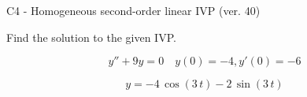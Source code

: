 \begin{exercise}
  \begin{exerciseTitle}C4 - Homogeneous second-order linear IVP (ver. 40)\end{exerciseTitle}
  \begin{exerciseStatement}
    
Find the solution to the given IVP.

    
\[y''+9y = 0 \hspace{1em} y(0) = -4 , y'(0) = -6\]

  \end{exerciseStatement}
  \begin{exerciseAnswer}
    
\[y= -4 \, \cos\left(3 \, t\right) - 2 \, \sin\left(3 \, t\right)\]

  \end{exerciseAnswer}
\end{exercise}